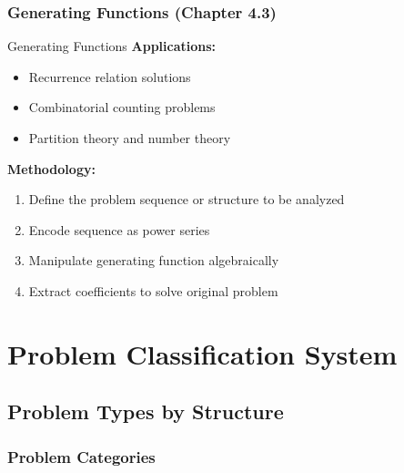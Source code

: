 \documentclass[12pt]{article}
\begin{document}
	\subsubsection{Generating Functions (Chapter 4.3)}
	
	\begin{tacticsbox}{Generating Functions}
		\textbf{Applications:}
		\begin{itemize}
			\item Recurrence relation solutions
			\item Combinatorial counting problems
			\item Partition theory and number theory
		\end{itemize}
		
		\textbf{Methodology:}
		\begin{enumerate}
			\item Define the problem sequence or structure to be analyzed
			\item Encode sequence as power series
			\item Manipulate generating function algebraically
			\item Extract coefficients to solve original problem
		\end{enumerate}
	\end{tacticsbox}
	
	\section{Problem Classification System}
	
	\subsection{Problem Types by Structure}
	
	\subsubsection{Problem Categories}
	
\end{document}
